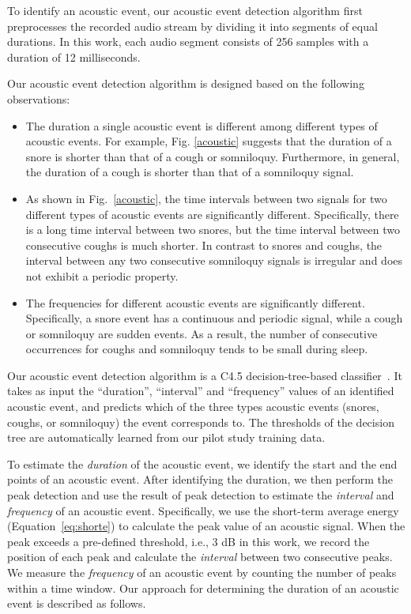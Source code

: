  To identify an acoustic event, our acoustic event detection algorithm first preprocesses the recorded audio
stream by dividing it into segments of equal durations. In this work, each
 audio segment consists of 256 samples with a duration of 12 milliseconds.

 Our acoustic event detection algorithm is designed based on the following observations:

 \begin{itemize}
 \item The duration a single acoustic event is different among different types of acoustic events. For example, Fig. \ref{acoustic}
     suggests that the duration of a snore is shorter than that of a cough or somniloquy. Furthermore, in general, the duration of a
     cough is shorter than that of a somniloquy signal.
 \item As shown in Fig.~\ref{acoustic}, the time intervals between two signals for two different types of acoustic events are
     significantly different. Specifically, there is a long time interval between two snores, but the time interval between two consecutive coughs is much shorter. In contrast to snores and coughs, the interval between any two consecutive somniloquy signals is irregular and does not exhibit a periodic property.
\item The frequencies for different acoustic events are significantly different. Specifically, a snore event has a continuous and periodic signal,
    while a cough or somniloquy are sudden events. As a result, the number of consecutive occurrences for coughs and somniloquy tends to
    be small during sleep.
\end{itemize}


 Our acoustic event detection algorithm is a C4.5 decision-tree-based
classifier~\cite{quinlan2014c4}. It takes as input the ``duration'', ``interval'' and ``frequency'' values of an identified acoustic event,
and predicts which of the three types acoustic events (snores, coughs, or somniloquy) the event corresponds to. The thresholds of the
decision tree are automatically learned from our pilot study training data.

To estimate the \emph{duration} of the acoustic event, we identify the start and the end points of an acoustic event. After identifying the
duration, we then perform the peak detection and use the result of peak detection to estimate the \emph{interval} and \emph{frequency} of
an acoustic event. Specifically, we use the short-term average energy (Equation~\ref{eq:shorte}) to calculate the peak value of an acoustic
signal. When the peak exceeds a pre-defined threshold, i.e., 3 dB in this work, we record the position of each peak and calculate the
\emph{interval} between two consecutive peaks. We measure the \emph{frequency} of an acoustic event by counting the number of peaks within
a time window. Our approach for determining the duration of an acoustic event is described as follows.


